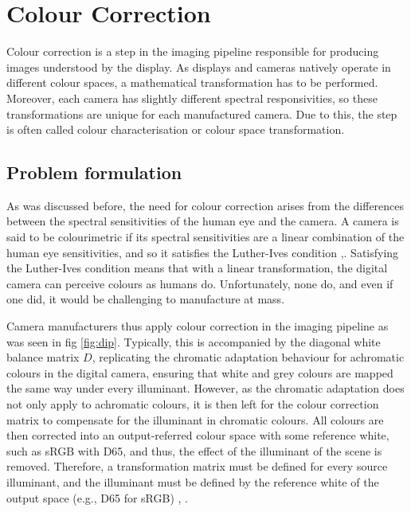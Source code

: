 \chapter{Colour Correction}%
\label{ch:cc}

Colour correction is a step in the imaging pipeline responsible for producing images understood by the display. As displays and cameras natively operate in different colour spaces, a mathematical transformation has to be performed. Moreover, each camera has slightly different spectral responsivities, so these transformations are unique for each manufactured camera. Due to this, the step is often called colour characterisation or colour space transformation.

\section{Problem formulation}

As was discussed before, the need for colour correction arises from the differences between the spectral sensitivities of the human eye and the camera. A camera is said to be colourimetric if its spectral sensitivities are a linear combination of the human eye sensitivities, and so it satisfies the Luther-Ives condition \cite{luther},\cite{ives}. Satisfying the Luther-Ives condition means that with a linear transformation, the digital camera can perceive colours as humans do. Unfortunately, none do, and even if one did, it would be challenging to manufacture at mass.

Camera manufacturers thus apply colour correction in the imaging pipeline as was seen in fig \ref{fig:dip}. Typically, this is accompanied by the diagonal white balance matrix $D$, replicating the chromatic adaptation behaviour for achromatic colours in the digital camera, ensuring that white and grey colours are mapped the same way under every illuminant. However, as the chromatic adaptation does not only apply to achromatic colours, it is then left for the colour correction matrix to compensate for the illuminant in chromatic colours. All colours are then corrected into an output-referred colour space with some reference white, such as sRGB with D65, and thus, the effect of the illuminant of the scene is removed. Therefore, a transformation matrix must be defined for every source illuminant, and the illuminant must be defined by the reference white of the output space (e.g., D65 for sRGB) \cite[4.25-4.45]{rowlands2020physics}, \cite{rowlands2020color}.

